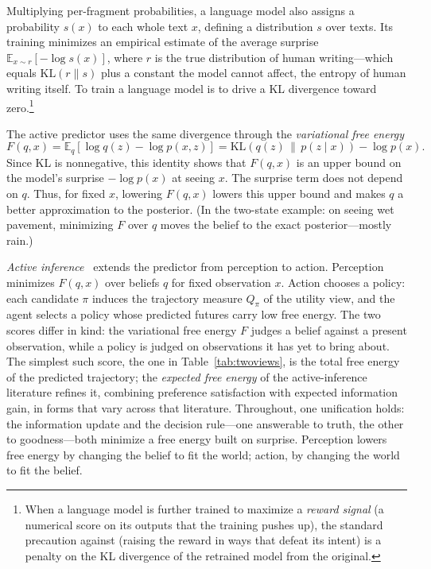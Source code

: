 Multiplying per-fragment probabilities, a language model also assigns a probability $s(x)$ to each whole text $x$, defining a distribution $s$ over texts. Its training minimizes an empirical estimate of the average surprise $\mathbb{E}_{x\sim r}[-\log s(x)]$, where $r$ is the true distribution of human writing---which equals $\mathrm{KL}(r\|s)$ plus a constant the model cannot affect, the entropy of human writing itself. To train a language model is to drive a KL divergence toward zero.\footnote{When a language model is further trained to maximize a \emph{reward signal} (a numerical score on its outputs that the training pushes up), the standard precaution against  (raising the reward in ways that defeat its intent) is a penalty on the KL divergence of the retrained model from the original.}

The active predictor uses the same divergence through the \emph{variational free energy}
\[
   F(q,x)=\mathbb{E}_{q}\!\left[\log q(z)-\log p(x,z)\right]
   =\mathrm{KL}\!\left(q(z)\,\big\|\,p(z\mid x)\right)-\log p(x).
\]
Since KL is nonnegative, this identity shows that $F(q,x)$ is an upper bound on the model's surprise $-\log p(x)$ at seeing $x$. The surprise term does not depend on $q$. Thus, for fixed $x$, lowering $F(q,x)$ lowers this upper bound and makes $q$ a better approximation to the posterior. (In the two-state example: on seeing wet pavement, minimizing $F$ over $q$ moves the belief to the exact posterior---mostly rain.)

\emph{Active inference}~\cite{parr2022} extends the predictor from perception to action. Perception minimizes $F(q,x)$ over beliefs $q$ for fixed observation $x$. Action chooses a policy: each candidate $\pi$ induces the trajectory measure $Q_\pi$ of the utility view, and the agent selects a policy whose predicted futures carry low free energy. The two scores differ in kind: the variational free energy $F$ judges a belief against a present observation, while a policy is judged on observations it has yet to bring about. The simplest such score, the one in Table~\ref{tab:twoviews}, is the total free energy of the predicted trajectory; the \emph{expected free energy} of the active-inference literature refines it, combining preference satisfaction with expected information gain, in forms that vary across that literature. Throughout, one unification holds: the information update and the decision rule---one answerable to truth, the other to goodness---both minimize a free energy built on surprise. Perception lowers free energy by changing the belief to fit the world; action, by changing the world to fit the belief.

